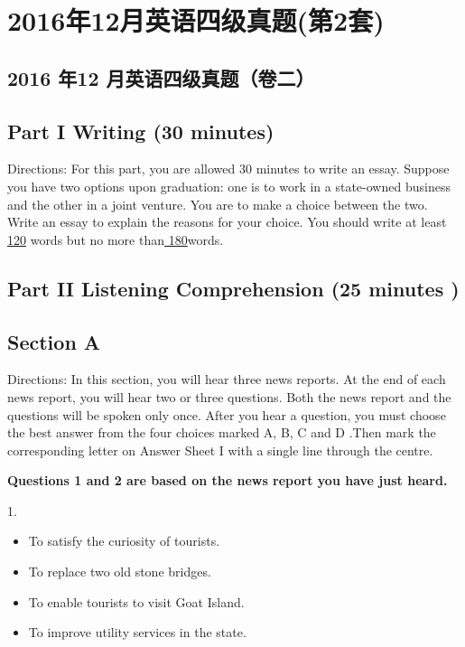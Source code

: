 \documentclass[UTF8,11pt]{ctexart}
\begin{document}
\section*{2016年12月英语四级真题(第2套)}
\subsection*{\textbf{2016 年12 月英语四级真题（卷二）}}


\subsection*{\textbf{Part I} \textbf{Writing} \textbf{(30 minutes)}}


Directions: For this part, you are allowed 30 minutes to write an essay. Suppose you have two options upon graduation: one is to work in a state-owned business and the other in a joint venture. You are to make a choice between the two. Write an essay to explain the reasons for your choice. You should write at least\uline{ 120} words but no more than\uline{ 180}words.


\subsection*{\textbf{Part} II \textbf{Listening Comprehension} \textbf{(25 minutes )}}


\subsection*{\textbf{Section A}}


Directions: In this section, you will hear three news reports. At the end of each news report, you will hear two or three questions. Both the news report and the questions will be spoken only once. After you hear a question, you must choose the best answer from the four choices marked A, B, C and D .Then mark the corresponding letter on Answer Sheet I with a single line through the centre.


\textbf{Questions 1 and 2 are based on the news report you have just heard.}


1.


\begin{itemize}[leftmargin=2em,itemsep=.2em,topsep=.4em]\item[A.] To satisfy the curiosity of tourists.
\item[B.] To replace two old stone bridges.
\item[C.] To enable tourists to visit Goat Island.
\item[D.] To improve utility services in the state.
\end{itemize}
\end{document}
